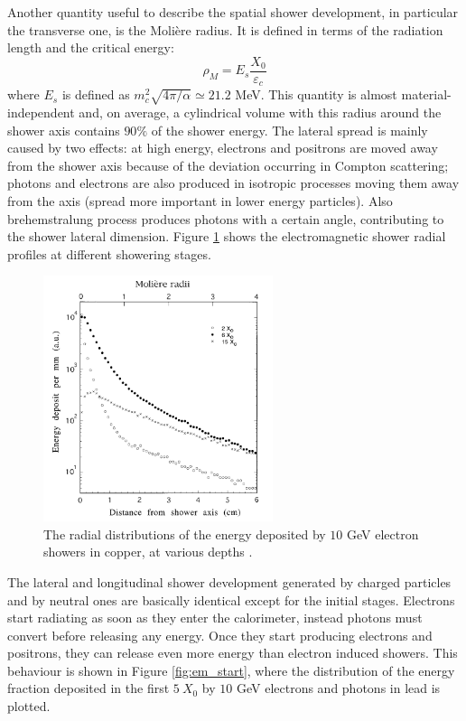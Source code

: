Another quantity useful to describe the spatial shower development, in particular the transverse one, is the Molière radius. It is defined in terms of the radiation length and the critical energy:
\begin{equation}
    \rho_M = E_s \frac{X_0}{\varepsilon_c}
\end{equation}
where $E_s$ is defined as $m_c^2\sqrt{4\pi/\alpha} \simeq 21.2$ MeV. This quantity is almost material-independent and, on average, a cylindrical volume with this radius around the shower axis contains $90\%$ of the shower energy. The lateral spread is mainly caused by two effects: at high energy, electrons and positrons are moved away from the shower axis because of the deviation occurring in Compton scattering; photons and electrons are also produced in isotropic processes moving them away from the axis (spread more important in lower energy particles). Also brehemstralung process produces photons with a certain angle, contributing to the shower lateral dimension. Figure \ref{fig:shower_moliere} shows the electromagnetic shower radial profiles at different showering stages.\\

\begin{figure}
	\centering
	\includegraphics[width=0.6\textwidth]{IMG/Cap2/shower_moliere.png}
	\caption{The radial distributions of the energy deposited by $10$ GeV electron showers in copper, at various depths \cite{Leo}.}
	\label{fig:shower_moliere}
\end{figure}

The lateral and longitudinal shower development generated by charged particles and by neutral ones are basically identical except for the initial stages. Electrons start radiating as soon as they enter the calorimeter, instead photons must convert before releasing any energy. Once they start producing electrons and positrons, they can release even more energy than electron induced showers. This behaviour is shown in Figure  \ref{fig:em_start}, where the distribution of the energy fraction deposited in the first $5\ X_0$ by $10$ GeV electrons and photons in lead is plotted.

